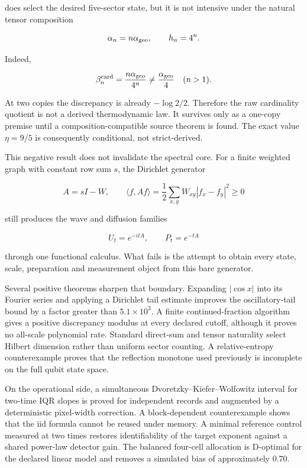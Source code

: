 \documentclass[11pt,a4paper,openany]{report}
\begin{document}
does select the desired five-sector state, but it is not intensive under the natural tensor composition

\[
\alpha_n=n\alpha_{\rm geo},\qquad
h_n=4^n .
\]

Indeed,

\[
\beta_n^{\rm card}=\frac{n\alpha_{\rm geo}}{4^n}
\neq \frac{\alpha_{\rm geo}}4\quad(n>1).
\]

At two copies the discrepancy is already \(-\log2/2\). Therefore the raw cardinality quotient is not a derived thermodynamic law. It survives only as a one-copy premise until a composition-compatible source theorem is found. The exact value \(\eta=9/5\) is consequently conditional, not strict-derived.

This negative result does not invalidate the spectral core. For a finite weighted graph with constant row sum \(s\), the Dirichlet generator

\[
A=sI-W,\qquad
\langle f,Af\rangle
=\frac12\sum_{x,y}W_{xy}|f_x-f_y|^2\ge0
\]

still produces the wave and diffusion families

\[
U_t=e^{-itA},\qquad P_t=e^{-tA}
\]

through one functional calculus. What fails is the attempt to obtain every state, scale, preparation and measurement object from this bare generator.

Several positive theorems sharpen that boundary. Expanding \(|\cos x|\) into its Fourier series and applying a Dirichlet tail estimate improves the oscillatory-tail bound by a factor greater than \(5.1\times10^3\). A finite continued-fraction algorithm gives a positive discrepancy modulus at every declared cutoff, although it proves no all-scale polynomial rate. Standard direct-sum and tensor naturality select Hilbert dimension rather than uniform sector counting. A relative-entropy counterexample proves that the reflection monotone used previously is incomplete on the full qubit state space.

On the operational side, a simultaneous Dvoretzky--Kiefer--Wolfowitz interval for two-time IQR slopes is proved for independent records and augmented by a deterministic pixel-width correction. A block-dependent counterexample shows that the iid formula cannot be reused under memory. A minimal reference control measured at two times restores identifiability of the target exponent against a shared power-law detector gain. The balanced four-cell allocation is D-optimal for the declared linear model and removes a simulated bias of approximately \(0.70\).
\end{document}
